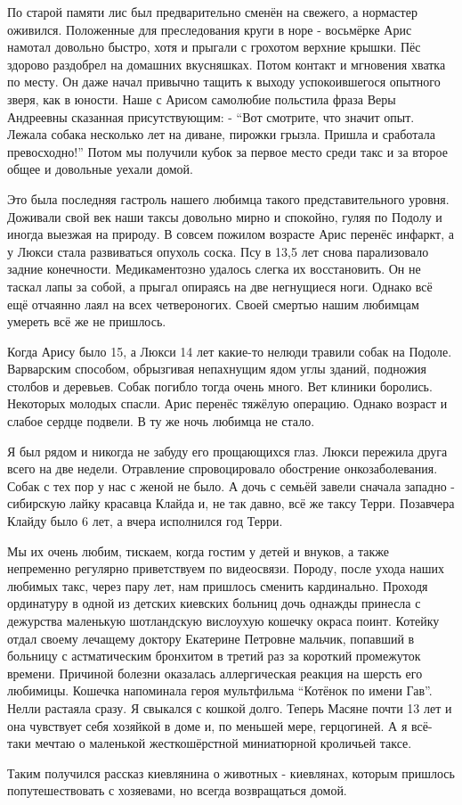 По старой памяти лис был предварительно сменён на свежего, а нормастер
оживился. Положенные для преследования круги в норе - восьмёрке Арис намотал
довольно быстро, хотя и прыгали с грохотом верхние крышки. Пёс здорово
раздобрел на домашних вкусняшках. Потом контакт и мгновения хватка по месту. Он
даже начал привычно тащить к выходу успокоившегося опытного зверя, как в
юности. Наше с Арисом самолюбие польстила фраза Веры Андреевны сказанная
присутствующим: - \enquote{Вот смотрите, что значит опыт. Лежала собака
несколько лет на диване, пирожки грызла. Пришла и сработала превосходно!} Потом
мы получили кубок за первое место среди такс и за второе общее и довольные
уехали домой.

Это была последняя гастроль нашего любимца такого представительного уровня.
Доживали свой век наши таксы довольно мирно и спокойно, гуляя по Подолу и
иногда выезжая на природу. В совсем пожилом возрасте Арис перенёс инфаркт, а у
Люкси стала развиваться опухоль соска. Псу в 13,5 лет снова парализовало задние
конечности. Медикаментозно удалось слегка их восстановить. Он не таскал лапы за
собой, а прыгал опираясь на две негнущиеся ноги. Однако всё ещё отчаянно лаял
на всех четвероногих. Своей смертью нашим любимцам умереть всё же не пришлось.

Когда Арису было 15, а Люкси 14 лет какие-то нелюди травили собак на Подоле.
Варварским способом, обрызгивая непахнущим ядом углы зданий, подножия столбов и
деревьев. Собак погибло тогда очень много. Вет клиники боролись. Некоторых
молодых спасли. Арис перенёс тяжёлую операцию. Однако возраст и слабое сердце
подвели. В ту же ночь любимца не стало. 

Я был рядом и никогда не забуду его прощающихся глаз. Люкси пережила друга
всего на две недели. Отравление спровоцировало обострение онкозаболевания.
Собак с тех пор у нас с женой не было. А дочь с семьёй завели сначала западно -
сибирскую лайку красавца Клайда и, не так давно, всё же таксу Терри. Позавчера
Клайду было 6 лет, а вчера исполнился год Терри. 

Мы их очень любим, тискаем, когда гостим у детей и внуков, а также   непременно
регулярно приветствуем по видеосвязи. Породу, после ухода наших любимых такс,
через пару лет, нам пришлось сменить кардинально. Проходя ординатуру в одной из
детских киевских больниц дочь однажды принесла с дежурства маленькую
шотландскую вислоухую кошечку окраса поинт. Котейку отдал своему лечащему
доктору Екатерине Петровне мальчик, попавший в больницу с астматическим
бронхитом в третий раз за короткий промежуток времени. Причиной болезни
оказалась аллергическая реакция на шерсть его любимицы. Кошечка напоминала
героя мультфильма \enquote{Котёнок по имени Гав}.  Нелли растаяла сразу. Я
свыкался с кошкой долго. Теперь Масяне почти 13 лет и она чувствует себя
хозяйкой в доме и, по меньшей мере, герцогиней. А я всё-таки мечтаю о маленькой
жесткошёрстной миниатюрной кроличьей таксе. 

Таким получился рассказ киевлянина о животных - киевлянах, которым пришлось
попутешествовать с хозяевами, но всегда возвращаться домой.

